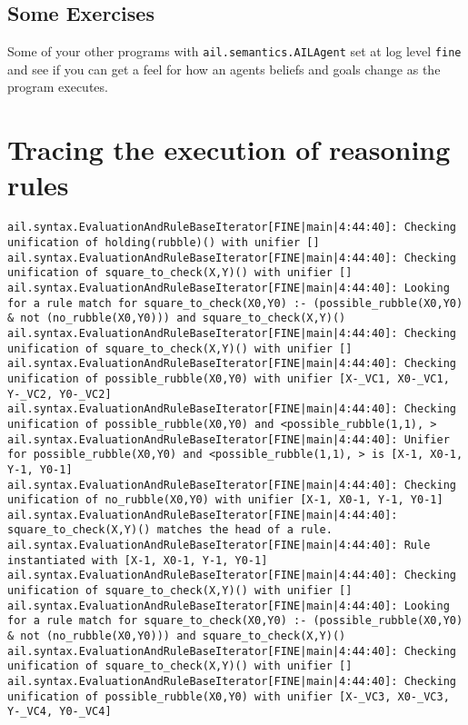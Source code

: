 \documentclass[a4]{article}
\begin{document}
\subsection{Some Exercises}
Some of your other programs with \texttt{ail.semantics.AILAgent} set at log level \texttt{fine} and see if you can get a feel for how an agents beliefs and goals change as the program executes.



\section{Tracing the execution of reasoning rules}

\begin{verbatim}
ail.syntax.EvaluationAndRuleBaseIterator[FINE|main|4:44:40]: Checking unification of holding(rubble)() with unifier [] 
ail.syntax.EvaluationAndRuleBaseIterator[FINE|main|4:44:40]: Checking unification of square_to_check(X,Y)() with unifier [] 
ail.syntax.EvaluationAndRuleBaseIterator[FINE|main|4:44:40]: Looking for a rule match for square_to_check(X0,Y0) :- (possible_rubble(X0,Y0) & not (no_rubble(X0,Y0))) and square_to_check(X,Y)() 
ail.syntax.EvaluationAndRuleBaseIterator[FINE|main|4:44:40]: Checking unification of square_to_check(X,Y)() with unifier [] 
ail.syntax.EvaluationAndRuleBaseIterator[FINE|main|4:44:40]: Checking unification of possible_rubble(X0,Y0) with unifier [X-_VC1, X0-_VC1, Y-_VC2, Y0-_VC2] 
ail.syntax.EvaluationAndRuleBaseIterator[FINE|main|4:44:40]: Checking unification of possible_rubble(X0,Y0) and <possible_rubble(1,1), > 
ail.syntax.EvaluationAndRuleBaseIterator[FINE|main|4:44:40]: Unifier for possible_rubble(X0,Y0) and <possible_rubble(1,1), > is [X-1, X0-1, Y-1, Y0-1] 
ail.syntax.EvaluationAndRuleBaseIterator[FINE|main|4:44:40]: Checking unification of no_rubble(X0,Y0) with unifier [X-1, X0-1, Y-1, Y0-1] 
ail.syntax.EvaluationAndRuleBaseIterator[FINE|main|4:44:40]: square_to_check(X,Y)() matches the head of a rule. 
ail.syntax.EvaluationAndRuleBaseIterator[FINE|main|4:44:40]: Rule instantiated with [X-1, X0-1, Y-1, Y0-1] 
ail.syntax.EvaluationAndRuleBaseIterator[FINE|main|4:44:40]: Checking unification of square_to_check(X,Y)() with unifier [] 
ail.syntax.EvaluationAndRuleBaseIterator[FINE|main|4:44:40]: Looking for a rule match for square_to_check(X0,Y0) :- (possible_rubble(X0,Y0) & not (no_rubble(X0,Y0))) and square_to_check(X,Y)() 
ail.syntax.EvaluationAndRuleBaseIterator[FINE|main|4:44:40]: Checking unification of square_to_check(X,Y)() with unifier [] 
ail.syntax.EvaluationAndRuleBaseIterator[FINE|main|4:44:40]: Checking unification of possible_rubble(X0,Y0) with unifier [X-_VC3, X0-_VC3, Y-_VC4, Y0-_VC4] 

\end{verbatim}
\end{document}
